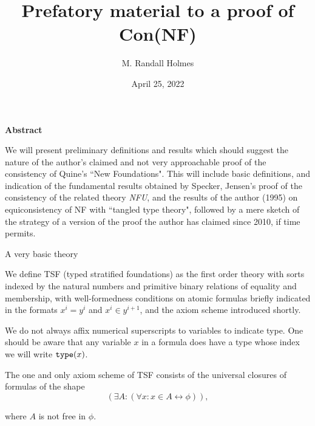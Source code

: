 \documentclass{slides}
\title{Prefatory material to a proof of Con(NF)}
\author{M. Randall Holmes}
\date{April 25, 2022}
\begin{document}
\begin{slide}

\maketitle

\begin{center}{\bf Abstract}\end{center}

We will present preliminary definitions and results which should suggest the nature of the author's claimed and not very approachable proof of the consistency of Quine's ``New Foundations".  This will include basic definitions, and indication of the fundamental results obtained by Specker, Jensen's proof of the consistency of the related theory {\em NFU\/}, and the results of the author (1995) on equiconsistency of NF with ``tangled type theory", followed by a mere sketch of the strategy of a version of the proof the author has claimed since 2010, if time permits.

\end{slide}

\begin{slide}

{\Large  A very basic theory}

We define TSF (typed stratified foundations) as the first order theory with sorts indexed by the natural numbers and primitive binary relations
of equality and membership, with well-formedness conditions on atomic formulas briefly indicated in the formats $x^i=y^i$ and $x^i \in y^{i+1}$, and the axiom scheme introduced shortly.

We do not always affix numerical superscripts to variables to indicate type.  One should be aware that any variable $x$ in a formula does have a type whose index we will write ${\tt type}(x)$.

The one and only axiom scheme of TSF consists of the universal closures of formulas of the shape $$(\exists A:(\forall x:x\in A \leftrightarrow \phi)),$$

where $A$ is not free in $\phi$.


\end{slide}
\end{document}
